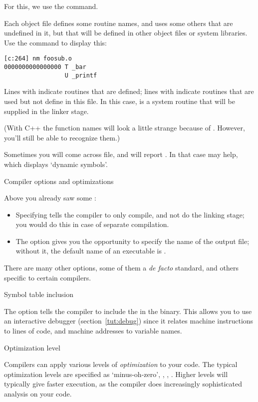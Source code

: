 For this, we use the  command.

Each object file defines some routine names, and uses some others that
are undefined in it, but that will be defined in other object files or
system libraries. Use the  command to display
this:
\begin{verbatim}
[c:264] nm foosub.o
0000000000000000 T _bar
                 U _printf
\end{verbatim}
Lines with  indicate routines that are defined; lines with 
indicate routines that are used but not define in this file. In this
case,  is a system routine that will be supplied in the
linker stage.

(With C++ the function names will look a little strange
because of . However, you'll still
be able to recognize them.)

Sometimes you will come across  file,
and  will report .
In that case  may help, which displays `dynamic symbols'.

 {Compiler options and optimizations}

Above you already saw some :
\begin{itemize}
\item Specifying  tells the compiler to only compile, and not do
  the linking stage; you would do this in case of separate
  compilation.
\item The option  gives you the opportunity to specify the name
  of the output file; without it, the default name of an executable is
  .
\end{itemize}

There are many other options, some of them a \emph{de facto} standard,
and others specific to certain compilers.

 {Symbol table inclusion}

The  option tells the compiler to include the  in the binary.  This allows you to use an interactive
debugger (section~\ref{tut:debug}) since it relates machine
instructions to lines of code, and machine addresses to variable
names.

 {Optimization level}

Compilers can apply various levels of
\emph{optimization} to your code. The
typical optimization levels are specified as  `minus-oh-zero',
, , . Higher levels will typically give faster
execution, as the compiler does increasingly sophisticated analysis on
your code.

